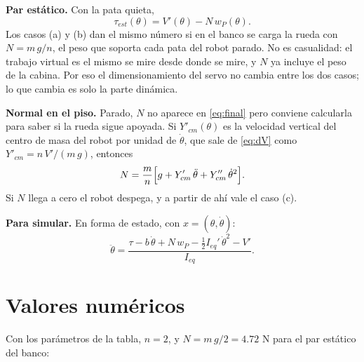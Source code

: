 \documentclass[11pt,a4paper]{article}
\begin{document}
\textbf{Par estático.} Con la pata quieta,
\begin{equation}
\tau_{est}(\theta)=V'(\theta)-N\,w_P(\theta).
\label{eq:tau_est}
\end{equation}
Los casos (a) y (b) dan el mismo número si en el banco se carga la rueda con \(N=m\,g/n\), el peso que
soporta cada pata del robot parado. No es casualidad: el trabajo virtual es el mismo se mire desde donde se
mire, y \(N\) ya incluye el peso de la cabina. Por eso el dimensionamiento del servo no cambia entre los dos
casos; lo que cambia es solo la parte dinámica.

\textbf{Normal en el piso.} Parado, \(N\) no aparece en \eqref{eq:final} pero conviene calcularla para saber
si la rueda sigue apoyada. Si \(Y'_{cm}(\theta)\) es la velocidad vertical del centro de masa del robot por
unidad de \(\dot\theta\), que sale de \eqref{eq:dV} como \(Y'_{cm}=n\,V'/(m\,g)\), entonces
\begin{equation}
N=\frac{m}{n}\Bigl[g+Y'_{cm}\,\ddot\theta+Y''_{cm}\,\dot\theta^2\Bigr].
\label{eq:N}
\end{equation}
Si \(N\) llega a cero el robot despega, y a partir de ahí vale el caso (c).

\textbf{Para simular.} En forma de estado, con \(x=(\theta,\dot\theta)\):
\begin{equation}
\ddot\theta=\frac{\tau-b\,\dot\theta+N\,w_P-\tfrac12 I_{eq}'\,\dot\theta^2-V'}{I_{eq}} .
\label{eq:estado}
\end{equation}

\section{Valores numéricos}

Con los parámetros de la tabla, \(n=2\), y \(N=m\,g/2=4.72\) N para el par estático del banco:
\end{document}
